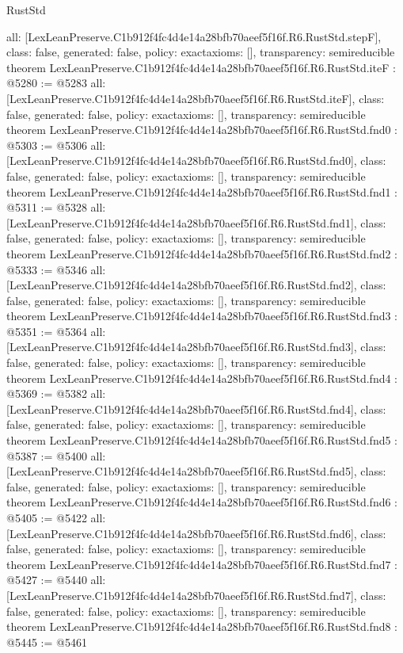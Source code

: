\begin{lexlean}{RustStd}
\begin{coremodule}
{  all: [LexLeanPreserve.C1b912f4fc4d4e14a28bfb70aeef5f16f.R6.RustStd.stepF],
  class: false,
  generated: false,
  policy: exact{axioms: []},
  transparency: semireducible
}
theorem LexLeanPreserve.C1b912f4fc4d4e14a28bfb70aeef5f16f.R6.RustStd.iteF : @5280 := @5283 {
  all: [LexLeanPreserve.C1b912f4fc4d4e14a28bfb70aeef5f16f.R6.RustStd.iteF],
  class: false,
  generated: false,
  policy: exact{axioms: []},
  transparency: semireducible
}
theorem LexLeanPreserve.C1b912f4fc4d4e14a28bfb70aeef5f16f.R6.RustStd.fnd0 : @5303 := @5306 {
  all: [LexLeanPreserve.C1b912f4fc4d4e14a28bfb70aeef5f16f.R6.RustStd.fnd0],
  class: false,
  generated: false,
  policy: exact{axioms: []},
  transparency: semireducible
}
theorem LexLeanPreserve.C1b912f4fc4d4e14a28bfb70aeef5f16f.R6.RustStd.fnd1 : @5311 := @5328 {
  all: [LexLeanPreserve.C1b912f4fc4d4e14a28bfb70aeef5f16f.R6.RustStd.fnd1],
  class: false,
  generated: false,
  policy: exact{axioms: []},
  transparency: semireducible
}
theorem LexLeanPreserve.C1b912f4fc4d4e14a28bfb70aeef5f16f.R6.RustStd.fnd2 : @5333 := @5346 {
  all: [LexLeanPreserve.C1b912f4fc4d4e14a28bfb70aeef5f16f.R6.RustStd.fnd2],
  class: false,
  generated: false,
  policy: exact{axioms: []},
  transparency: semireducible
}
theorem LexLeanPreserve.C1b912f4fc4d4e14a28bfb70aeef5f16f.R6.RustStd.fnd3 : @5351 := @5364 {
  all: [LexLeanPreserve.C1b912f4fc4d4e14a28bfb70aeef5f16f.R6.RustStd.fnd3],
  class: false,
  generated: false,
  policy: exact{axioms: []},
  transparency: semireducible
}
theorem LexLeanPreserve.C1b912f4fc4d4e14a28bfb70aeef5f16f.R6.RustStd.fnd4 : @5369 := @5382 {
  all: [LexLeanPreserve.C1b912f4fc4d4e14a28bfb70aeef5f16f.R6.RustStd.fnd4],
  class: false,
  generated: false,
  policy: exact{axioms: []},
  transparency: semireducible
}
theorem LexLeanPreserve.C1b912f4fc4d4e14a28bfb70aeef5f16f.R6.RustStd.fnd5 : @5387 := @5400 {
  all: [LexLeanPreserve.C1b912f4fc4d4e14a28bfb70aeef5f16f.R6.RustStd.fnd5],
  class: false,
  generated: false,
  policy: exact{axioms: []},
  transparency: semireducible
}
theorem LexLeanPreserve.C1b912f4fc4d4e14a28bfb70aeef5f16f.R6.RustStd.fnd6 : @5405 := @5422 {
  all: [LexLeanPreserve.C1b912f4fc4d4e14a28bfb70aeef5f16f.R6.RustStd.fnd6],
  class: false,
  generated: false,
  policy: exact{axioms: []},
  transparency: semireducible
}
theorem LexLeanPreserve.C1b912f4fc4d4e14a28bfb70aeef5f16f.R6.RustStd.fnd7 : @5427 := @5440 {
  all: [LexLeanPreserve.C1b912f4fc4d4e14a28bfb70aeef5f16f.R6.RustStd.fnd7],
  class: false,
  generated: false,
  policy: exact{axioms: []},
  transparency: semireducible
}
theorem LexLeanPreserve.C1b912f4fc4d4e14a28bfb70aeef5f16f.R6.RustStd.fnd8 : @5445 := @5461 {
}
\end{coremodule}
\end{lexlean}

